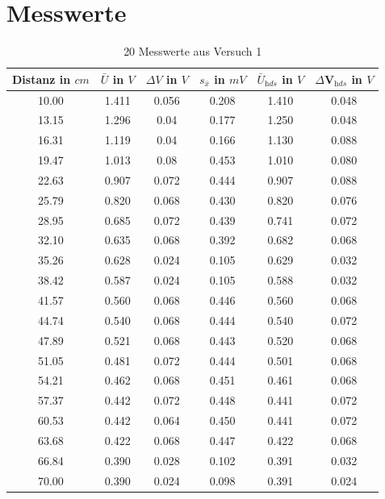 \documentclass[12pt,oneside,a4paper]{report}
\begin{document}
\section{Messwerte}
\begin{table}[H]
\centering
\begin{tabular}{cccccc}
\hline
Distanz in $cm$ & $\bar{U} $ in $V$ & $\Delta V$ in $V$ & $s_{\bar{x}}$ in $mV$ &  $\bar{U}_{\textit{hds}}$ in $V$ & $\Delta $V$_{\textit{hds}}$ in $V$\\ 
\hline  
 10.00 & 1.411 & 0.056 & 0.208 & 1.410 & 0.048\\
 13.15 & 1.296 & 0.04  & 0.177 & 1.250 & 0.048\\
 16.31 & 1.119 & 0.04  & 0.166 & 1.130 & 0.088\\
 19.47 & 1.013 & 0.08  & 0.453 & 1.010 & 0.080\\
 22.63 & 0.907 & 0.072 & 0.444 & 0.907 & 0.088\\
 25.79 & 0.820 & 0.068 & 0.430 & 0.820 & 0.076\\
 28.95 & 0.685 & 0.072 & 0.439 & 0.741 & 0.072\\
 32.10 & 0.635 & 0.068 & 0.392 & 0.682 & 0.068\\
 35.26 & 0.628 & 0.024 & 0.105 & 0.629 & 0.032\\
 38.42 & 0.587 & 0.024 & 0.105 & 0.588 & 0.032\\
 41.57 & 0.560 & 0.068 & 0.446 & 0.560 & 0.068\\
 44.74 & 0.540 & 0.068 & 0.444 & 0.540 & 0.072\\
 47.89 & 0.521 & 0.068 & 0.443 & 0.520 & 0.068\\
 51.05 & 0.481 & 0.072 & 0.444 & 0.501 & 0.068\\
 54.21 & 0.462 & 0.068 & 0.451 & 0.461 & 0.068\\
 57.37 & 0.442 & 0.072 & 0.448 & 0.441 & 0.072\\
 60.53 & 0.442 & 0.064 & 0.450 & 0.441 & 0.072\\
 63.68 & 0.422 & 0.068 & 0.447 & 0.422 & 0.068\\
 66.84 & 0.390 & 0.028 & 0.102 & 0.391 & 0.032\\
 70.00 & 0.390 & 0.024 & 0.098 & 0.391 & 0.024\\ 
 \hline
\end{tabular}
\caption{20 Messwerte aus Versuch 1}
\label{tab:MESSWERTE1}
\end{table}
\end{document}
